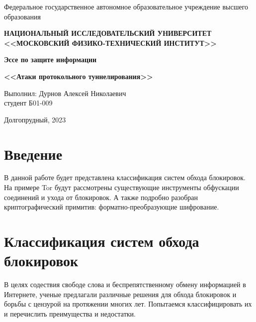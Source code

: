 
\newcommand{\boldm}[1]{{\boldsymbol{#1}}}

\usepackage{upgreek}


\begin{center}

    \normalsize{Федеральное государственное автономное образовательное учреждение высшего образования}

    \textbf{НАЦИОНАЛЬНЫЙ ИССЛЕДОВАТЕЛЬСКИЙ УНИВЕРСИТЕТ \\ <<МОСКОВСКИЙ ФИЗИКО-ТЕХНИЧЕСКИЙ ИНСТИТУТ>>}
    \vspace{13ex}

    \textbf{Эссе по защите информации}

    \textbf{<<Атаки протокольного туннелирования>>}
    \vspace{40ex}
\end{center}
\begin{flushright}
    \normalsize{Выполнил: Дурнов Алексей Николаевич \\ студент Б01-009 \\}
\end{flushright}

\vfill

\begin{center}
Долгопрудный, 2023
\end{center}

\thispagestyle{empty} %

\newpage

\tableofcontents{}
\newpage

\section{Введение}



В данной работе будет представлена классификация систем обхода блокировок.
На примере Tor будут рассмотрены существующие инструменты обфускации соединений и ухода от блокировок.
А также подробно разобран криптографический примитив: форматно-преобразующие шифрование.

\section{Классификация систем обхода блокировок}
В целях содествия свободе слова и беспрепятственному обмену информацией в Интернете,
ученые предлагали различные решения для обхода блокировок и борьбы с цензурой на протяжении многих лет.
Попытаемся классифицировать их и перечислить преимущества и недостатки.

